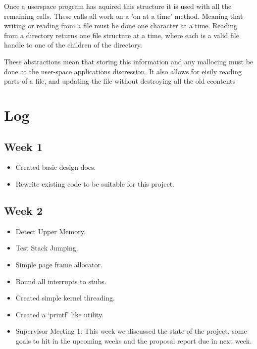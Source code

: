 \documentclass[a4paper]{report}
\begin{document}
Once a userspace program has aquired this structure it is used with all the remaining calls. These calls all work on a 'on at a time' method. Meaning that writing or reading from a file must be done one character at a time. Reading from a directory returns one file structure at a time, where each is a valid file handle to one of the children of the directory.

These abstractions mean that storing this information and any mallocing must be done at the user-space applications discression. It also allows for eisily reading parts of a file, and updating the file without destroying all the old ccontents























\chapter{Log}


\section{Week 1}
\begin{itemize}
\item Created basic design docs.
\item Rewrite existing code to be suitable for this project.
\end{itemize}

\section{Week 2}
\begin{itemize}
\item Detect Upper Memory.
\item Test Stack Jumping.
\item Simple page frame allocator.
\item Bound all interrupts to stubs.
\item Created simple kernel threading.
\item Created a `printf' like utility.
\item Supervisor Meeting 1: This week we discussed the state of the project, some goals to hit in the upcoming weeks and the proposal report due in next week.
\end{itemize}
\end{document}
